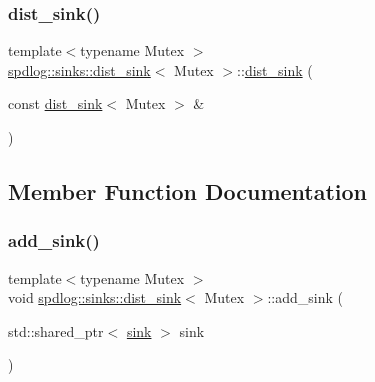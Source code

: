 \mbox{\label{classspdlog_1_1sinks_1_1dist__sink_afadef20aeb435c8b62b2efa2f0906de5}} 
\subsubsection{\texorpdfstring{dist\+\_\+sink()}{dist\_sink()}\hspace{0.1cm}{\footnotesize\ttfamily [2/2]}}
{\footnotesize\ttfamily template$<$typename Mutex $>$ \\
\hyperlink{classspdlog_1_1sinks_1_1dist__sink}{spdlog\+::sinks\+::dist\+\_\+sink}$<$ Mutex $>$\+::\hyperlink{classspdlog_1_1sinks_1_1dist__sink}{dist\+\_\+sink} (\begin{DoxyParamCaption}\item[{const \hyperlink{classspdlog_1_1sinks_1_1dist__sink}{dist\+\_\+sink}$<$ Mutex $>$ \&}]{ }\end{DoxyParamCaption})\hspace{0.3cm}{\ttfamily [delete]}}



\subsection{Member Function Documentation}
\mbox{\label{classspdlog_1_1sinks_1_1dist__sink_ae2250f59f23ecaf3214da6059198ad3c}} 
\subsubsection{\texorpdfstring{add\+\_\+sink()}{add\_sink()}}
{\footnotesize\ttfamily template$<$typename Mutex $>$ \\
void \hyperlink{classspdlog_1_1sinks_1_1dist__sink}{spdlog\+::sinks\+::dist\+\_\+sink}$<$ Mutex $>$\+::add\+\_\+sink (\begin{DoxyParamCaption}\item[{std\+::shared\+\_\+ptr$<$ \hyperlink{classspdlog_1_1sinks_1_1sink}{sink} $>$}]{sink }\end{DoxyParamCaption})\hspace{0.3cm}{\ttfamily [inline]}}



